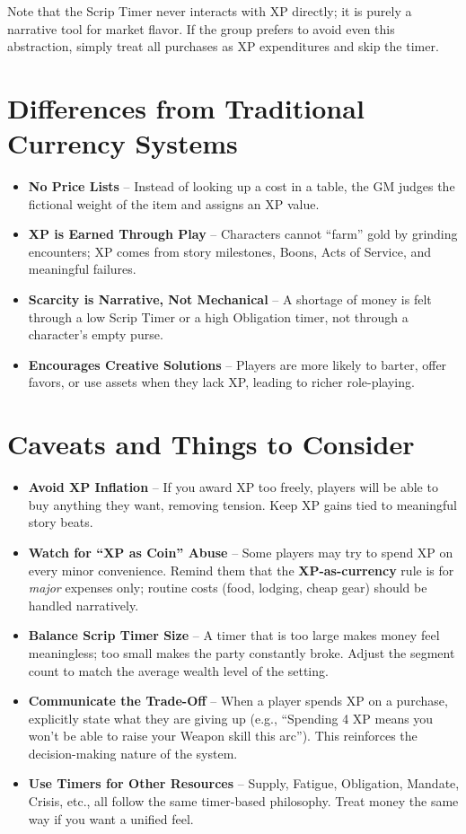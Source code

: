 Note that the Scrip Timer never interacts with XP directly; it is purely a narrative tool for market flavor. If the group prefers to avoid even this abstraction, simply treat all purchases as XP expenditures and skip the timer.

\section{Differences from Traditional Currency Systems}
\begin{itemize}
  \item \textbf{No Price Lists} -- Instead of looking up a cost in a table, the GM judges the fictional weight of the item and assigns an XP value.
  \item \textbf{XP is Earned Through Play} -- Characters cannot ``farm'' gold by grinding encounters; XP comes from story milestones, Boons, Acts of Service, and meaningful failures.
  \item \textbf{Scarcity is Narrative, Not Mechanical} -- A shortage of money is felt through a low Scrip Timer or a high Obligation timer, not through a character's empty purse.
  \item \textbf{Encourages Creative Solutions} -- Players are more likely to barter, offer favors, or use assets when they lack XP, leading to richer role-playing.
\end{itemize}

\section{Caveats and Things to Consider}
\begin{itemize}
  \item \textbf{Avoid XP Inflation} -- If you award XP too freely, players will be able to buy anything they want, removing tension. Keep XP gains tied to meaningful story beats.
  \item \textbf{Watch for ``XP as Coin'' Abuse} -- Some players may try to spend XP on every minor convenience. Remind them that the \textbf{XP-as-currency} rule is for \textit{major} expenses only; routine costs (food, lodging, cheap gear) should be handled narratively.
  \item \textbf{Balance Scrip Timer Size} -- A timer that is too large makes money feel meaningless; too small makes the party constantly broke. Adjust the segment count to match the average wealth level of the setting.
  \item \textbf{Communicate the Trade-Off} -- When a player spends XP on a purchase, explicitly state what they are giving up (e.g., ``Spending 4 XP means you won't be able to raise your Weapon skill this arc''). This reinforces the decision-making nature of the system.
  \item \textbf{Use Timers for Other Resources} -- Supply, Fatigue, Obligation, Mandate, Crisis, etc., all follow the same timer-based philosophy. Treat money the same way if you want a unified feel.
\end{itemize}

